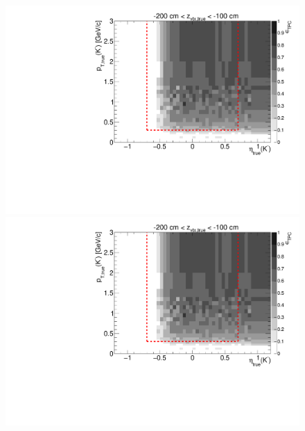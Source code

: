 \begin{figure}[hb]
{  \includegraphics[width=\linewidth,page=16]{graphics/eff/Eff2D_TPC_kaon_Minus.pdf}\\
  \includegraphics[width=\linewidth,page=18]{graphics/eff/Eff2D_TPC_kaon_Minus.pdf}
}%
\end{figure}


